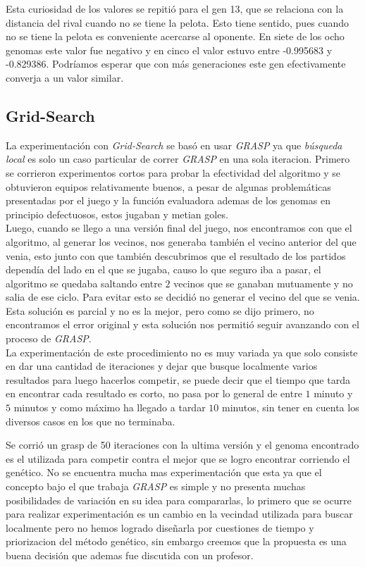 Esta curiosidad de los valores se repitió para el gen 13, que se relaciona con la distancia del rival cuando no se tiene la pelota. Esto tiene sentido, pues cuando no se tiene la pelota es conveniente acercarse al oponente. En siete de los ocho genomas este valor fue negativo y en cinco el valor estuvo entre -0.995683 y -0.829386. Podríamos esperar que con más generaciones este gen efectivamente converja a un valor similar.



\subsection{Grid-Search}

La experimentación con \emph{Grid-Search} se basó en usar \emph{GRASP} ya que \emph{búsqueda local} es solo un caso particular
de correr \emph{GRASP} en una sola iteracion.
Primero se corrieron experimentos cortos para probar la efectividad del algoritmo y se obtuvieron equipos relativamente buenos,
a pesar de algunas problemáticas presentadas por el juego y la función evaluadora ademas de los genomas en principio defectuosos,
estos jugaban y metian goles.\\

Luego, cuando se llego a una versión final del juego, nos encontramos con que el algoritmo, al generar los vecinos, nos generaba también
el vecino anterior del que venia, esto junto con que también descubrimos que el resultado de los partidos dependía del lado en el
que se jugaba, causo lo que seguro iba a pasar, el algoritmo se quedaba saltando entre $2$ vecinos que se ganaban mutuamente y no
salia de ese ciclo.
Para evitar esto se decidió no generar el vecino del que se venia. Esta solución es parcial y no es la mejor, pero como se dijo primero,
no encontramos el error original y esta solución nos permitió seguir avanzando con el proceso de \emph{GRASP}.\\


La experimentación de este procedimiento no es muy variada ya que solo consiste en dar una cantidad de iteraciones y dejar que
busque localmente varios resultados para luego hacerlos competir, se puede decir que el tiempo que tarda en encontrar
cada resultado es corto, no pasa por lo general de entre $1$ minuto y $5$ minutos y como máximo ha llegado a tardar $10$ minutos, sin tener en cuenta
los diversos casos en los que no terminaba.


Se corrió un grasp de 50 iteraciones con la ultima versión y el genoma encontrado es el utilizada para competir contra el mejor que se logro encontrar
corriendo el genético. No se encuentra mucha mas experimentación que esta ya que el concepto bajo el que trabaja \emph{GRASP}
es simple y no presenta muchas posibilidades de variación en su idea para compararlas, lo primero que se ocurre para realizar
experimentación es un cambio en la vecindad utilizada para buscar localmente pero no hemos logrado diseñarla por cuestiones
de tiempo y priorizacion del método genético, sin embargo
creemos que la propuesta es una buena decisión que ademas fue discutida con un profesor.
